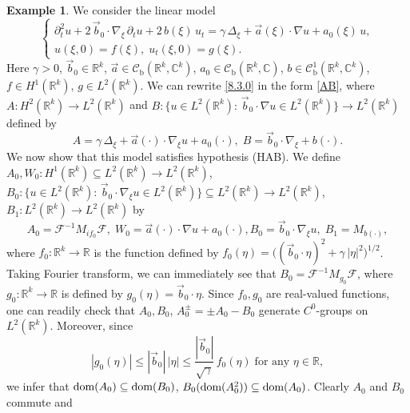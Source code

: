\documentclass[11pt]{amsart}
\numberwithin{equation}{section}
\newcommand\R{\mathbb R}
\newcommand\C{\mathbb C}
\newcommand{\RR}{{\mathbb R}}
\newcommand{\rmb}{{\mathrm{b}}}
\theoremstyle{remark}
\theoremstyle{definition}
\newtheorem{example}[theorem]{Example}
\newcommand\cC{{\mathcal C}}
\newcommand{\dom}{\text{\rm{dom}}}
\begin{document}
\begin{example}\label{l8.3}
	We consider the linear model
	\begin{equation}\label{8.3.0}
		\begin{cases}
			\partial_t^2 u + 2\,\vec{b}_0 \cdot \nabla_\xi\,\partial_t u + 2\,b(\xi)\,u_t
			= \gamma\,\Delta_\xi + \vec{a}(\xi)\cdot\nabla u + a_0(\xi)\,u,\\
			u(\xi,0) = f(\xi),\;
			u_t(\xi,0) = g(\xi).
		\end{cases}
	\end{equation}
	Here $\gamma > 0$, $\vec{b}_0 \in \R^k$, $\vec{a} \in \cC_\rmb(\R^k,\C^k)$,
	$a_0 \in \cC_\rmb(\R^k,\C)$, $b \in \cC^1_\rmb(\R^k,\C^k)$, $f \in H^1(\R^k)$, $g \in L^2(\R^k)$.	We can rewrite \eqref{8.3.0} in the form \eqref{AB}, where $A:H^2(\RR^k)\to L^2(\R^k)$ and $B:\{u \in L^2(\R^k):\, \vec{b}_0\cdot\nabla u \in L^2(\R^k)\}\to L^2(\RR^k)$ defined by
	\begin{equation}\label{8.3.1}
		A=\gamma\,\Delta_\xi + \vec{a}(\cdot)\cdot\nabla_\xi u + a_0(\cdot),\;B=\vec{b}_0\cdot\nabla_\xi+b(\cdot).
	\end{equation}
	We now show that this model satisfies hypothesis (HAB). We define $A_0, W_0: H^1(\R^k) \subseteq L^2(\R^k) \to L^2(\R^k)$,
	$B_0: \{u \in L^2(\R^k):\, \vec{b}_0\cdot\nabla_\xi u \in L^2(\R^k)\} \subseteq L^2(\R^k) \to L^2(\R^k)$,
	$B_1: L^2(\R^k) \to L^2(\R^k)$ by
	\begin{equation}\label{8.3.2}
		A_0 = \mathcal{F}^{-1} M_{if_0} \mathcal{F},\;W_0 = \vec{a}(\cdot)\cdot\nabla u + a_0(\cdot),B_0 = \vec{b}_0\cdot\nabla_\xi u,\; B_1 = M_{b(\cdot)},
	\end{equation}
	where $f_0:\R^k\to\R$ is the function defined by $f_0(\eta) = \big((\vec{b}_0\cdot\eta)^2 + \gamma\,|\eta|^2\big)^{1/2}$.
	Taking Fourier transform, we can immediately see that $B_0 = \mathcal{F}^{-1} M_{g_0} \mathcal{F}$,
	where $g_0:\R^k \to \R$ is defined by $g_0(\eta) = \vec{b}_0\cdot\eta$. Since $f_0, g_0$ are real-valued functions,
	one can readily check that $A_0, B_0$, $A_0^\pm = \pm A_0 - B_0$ generate $C^0$-groups on
	$L^2(\R^k)$. Moreover, since
	\begin{equation}\label{8.3.3}
		|g_0(\eta)| \leq |\vec{b}_0|\,|\eta| \leq \frac{|\vec{b}_0|}{\sqrt{\gamma}}\,f_0(\eta)
		\;\text{for any } \eta\in\R,
	\end{equation}
	we infer that $\dom(A_0) \subseteq \dom(B_0)$, $B_0(\dom(A_0^2)) \subseteq \dom(A_0)$.
	Clearly $A_0$ and $B_0$ commute and
	\begin{equation}\label{8.3.4}

\end{equation}
\end{example}
\end{document}
